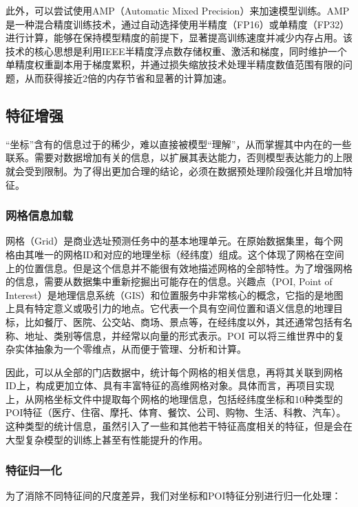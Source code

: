 \documentclass{article}
\begin{document}
此外，可以尝试使用AMP（Automatic Mixed Precision）来加速模型训练\cite{micikevicius_mixed_2018}。AMP是一种混合精度训练技术，通过自动选择使用半精度（FP16）或单精度（FP32）进行计算，能够在保持模型精度的前提下，显著提高训练速度并减少内存占用。该技术的核心思想是利用IEEE半精度浮点数存储权重、激活和梯度，同时维护一个单精度权重副本用于梯度累积，并通过损失缩放技术处理半精度数值范围有限的问题，从而获得接近2倍的内存节省和显著的计算加速。

\subsection{特征增强}

“坐标”含有的信息过于的稀少，难以直接被模型“理解”，从而掌握其中内在的一些联系。需要对数据增加有关的信息，以扩展其表达能力，否则模型表达能力的上限就会受到限制\cite{Shalev-Shwartz2014UnderstandingML}。为了得出更加合理的结论，必须在数据预处理阶段强化并且增加特征。

\subsubsection{网格信息加载}

网格（Grid）是商业选址预测任务中的基本地理单元。在原始数据集里，每个网格由其唯一的网格ID和对应的地理坐标（经纬度）组成。这个体现了网格在空间上的位置信息。但是这个信息并不能很有效地描述网格的全部特性。为了增强网格的信息，需要从数据集中重新挖掘出可能存在的信息。兴趣点（POI, Point of Interest）是地理信息系统（GIS）和位置服务中非常核心的概念，它指的是地图上具有特定意义或吸引力的地点。它代表一个具有空间位置和语义信息的地理目标，比如餐厅、医院、公交站、商场、景点等，在经纬度以外，其还通常包括有名称、地址、类别等信息，并经常以向量的形式表示。POI 可以将三维世界中的复杂实体抽象为一个零维点，从而便于管理、分析和计算\cite{psyllidis_points_2022}。

因此，可以从全部的门店数据中，统计每个网格的相关信息，再将其关联到网格ID上，构成更加立体、具有丰富特征的高维网格对象。具体而言，再项目实现上，从网格坐标文件中提取每个网格的地理信息，包括经纬度坐标和10种类型的POI特征（医疗、住宿、摩托、体育、餐饮、公司、购物、生活、科教、汽车）。这种类型的统计信息，虽然引入了一些和其他若干特征高度相关的特征，但是会在大型复杂模型的训练上甚至有性能提升的作用\cite{Heaton_2016}。

\subsubsection{特征归一化}

为了消除不同特征间的尺度差异，我们对坐标和POI特征分别进行归一化处理：
\end{document}
